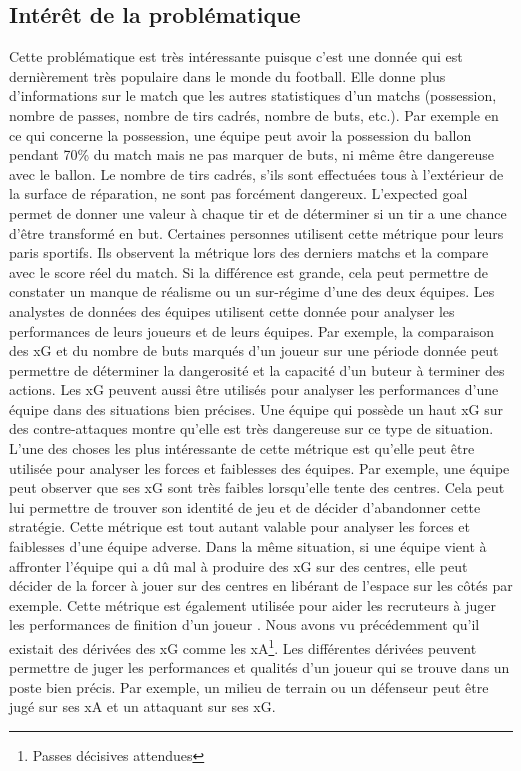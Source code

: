 \documentclass[12pt]{article}
\begin{document}
\subsection{Intérêt de la problématique}
Cette problématique est très intéressante puisque c'est une donnée qui est dernièrement très populaire dans le monde du football. Elle donne plus d'informations sur le match que les autres statistiques d'un matchs (possession, nombre de passes, nombre de tirs cadrés, nombre de buts, etc.). Par exemple en ce qui concerne la possession, une équipe peut avoir la possession du ballon pendant 70\% du match mais ne pas marquer de buts, ni même être dangereuse avec le ballon. Le nombre de tirs cadrés, s'ils sont effectuées tous à l'extérieur de la surface de réparation, ne sont pas forcément dangereux. L'expected goal permet de donner une valeur à chaque tir et de déterminer si un tir a une chance d'être transformé en but.
\newline \newline
Certaines personnes utilisent cette métrique pour leurs paris sportifs. Ils observent la métrique lors des derniers matchs et la compare avec le score réel du match. Si la différence est grande, cela peut permettre de constater un manque de réalisme ou un sur-régime d'une des deux équipes. \cite{tennerelBienUtiliserExpected2022a}
\newline \newline
Les analystes de données des équipes utilisent cette donnée pour analyser les performances de leurs joueurs et de leurs équipes. Par exemple, la comparaison des xG et du nombre de buts marqués d'un joueur sur une période donnée peut permettre de déterminer la dangerosité et la capacité d'un buteur à terminer des actions. \cite{pettyWhatExpectedGoals2018a}
Les xG peuvent aussi être utilisés pour analyser les performances d'une équipe dans des situations bien précises. Une équipe qui possède un haut xG sur des contre-attaques montre qu'elle est très dangereuse sur ce type de situation. \cite{XGExplainedFBrefa}
L'une des choses les plus intéressante de cette métrique est qu'elle peut être utilisée pour analyser les forces et faiblesses des équipes. Par exemple, une équipe peut observer que ses xG sont très faibles lorsqu'elle tente des centres. Cela peut lui permettre de trouver son identité de jeu et de décider d'abandonner cette stratégie. Cette métrique est tout autant valable pour analyser les forces et faiblesses d'une équipe adverse. Dans la même situation, si une équipe vient à affronter l'équipe qui a dû mal à produire des xG sur des centres, elle peut décider de la forcer à jouer sur des centres en libérant de l'espace sur les côtés par exemple.
\newline \newline
Cette métrique est également utilisée pour aider les recruteurs à juger les performances de finition d'un joueur \cite{garratt-stanleyWhatExpectedGoals2022}. Nous avons vu précédemment qu'il existait des dérivées des xG comme les xA\footnote{Passes décisives attendues}. Les différentes dérivées peuvent permettre de juger les performances et qualités d'un joueur qui se trouve dans un poste bien précis. Par exemple, un milieu de terrain ou un défenseur peut être jugé sur ses xA et un attaquant sur ses xG.
\end{document}

